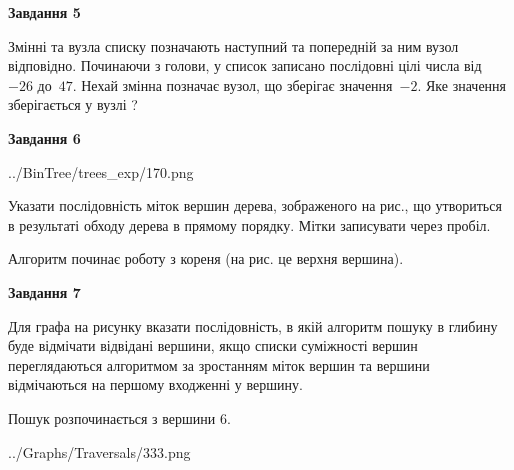 \documentclass[12pt, ukrainian]{article}
\begin{document}
{\begin {large}
{\begin {center}\textbf{Завдання 5}\end {center}}\par
Змінні  та  вузла списку позначають наступний та попередній за ним вузол відповідно. Починаючи з голови, у список записано послідовні цілі числа від~$-26$ до~$47$. Нехай змінна  позначає вузол, що зберігає значення~$-2$.
Яке значення зберігається у вузлі  ?\par
\newpage

{\begin {center}\textbf{Завдання 6}\end {center}}\par

\begin{center}
	{../BinTree/trees_exp/170.png}
\end{center}
Указати послідовність міток вершин дерева, зображеного на рис., що утвориться в результаті обходу дерева в прямому порядку. Мітки записувати через пробіл.\par Алгоритм починає роботу з кореня (на рис. це верхня вершина).\par
\newpage

{\begin {center}\textbf{Завдання 7}\end {center}}\par
Для графа на рисунку вказати послідовність, в якій алгоритм пошуку в глибину буде відмічати відвідані вершини, якщо списки суміжності вершин переглядаються алгоритмом за зростанням міток вершин та вершини відмічаються на першому вход\-женні у вершину.\par
Пошук розпочинається з вершини 6.\par

\begin{center}
	{../Graphs/Traversals/333.png}
\end{center}\par
\newpage


\end{large}}
\end{document}
